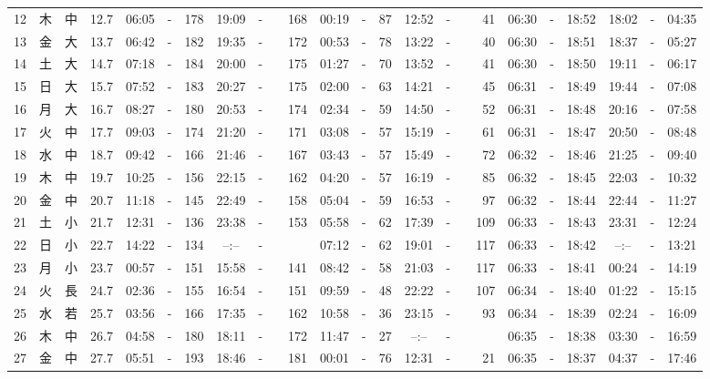 \documentclass[12pt,a4j]{jsarticle}
\begin{document}
\begin{table}[htbp]
\begin{center}
{\begin{tabular}{|rc|cr|ccrccr|ccrccr|ccc|ccc|}
12 & 木 & 中 & 12.7 &  06:05 &-& 178 &  19:09 &-& 168 &  00:19 &-&  87 &  12:52 &-&  41 & 06:30 & -& 18:52 & 18:02 & -& 04:35 \\
13 & 金 & 大 & 13.7 &  06:42 &-& 182 &  19:35 &-& 172 &  00:53 &-&  78 &  13:22 &-&  40 & 06:30 & -& 18:51 & 18:37 & -& 05:27 \\
14 & 土 & 大 & 14.7 &  07:18 &-& 184 &  20:00 &-& 175 &  01:27 &-&  70 &  13:52 &-&  41 & 06:30 & -& 18:50 & 19:11 & -& 06:17 \\
15 & 日 & 大 & 15.7 &  07:52 &-& 183 &  20:27 &-& 175 &  02:00 &-&  63 &  14:21 &-&  45 & 06:31 & -& 18:49 & 19:44 & -& 07:08 \\
16 & 月 & 大 & 16.7 &  08:27 &-& 180 &  20:53 &-& 174 &  02:34 &-&  59 &  14:50 &-&  52 & 06:31 & -& 18:48 & 20:16 & -& 07:58 \\
17 & 火 & 中 & 17.7 &  09:03 &-& 174 &  21:20 &-& 171 &  03:08 &-&  57 &  15:19 &-&  61 & 06:31 & -& 18:47 & 20:50 & -& 08:48 \\
18 & 水 & 中 & 18.7 &  09:42 &-& 166 &  21:46 &-& 167 &  03:43 &-&  57 &  15:49 &-&  72 & 06:32 & -& 18:46 & 21:25 & -& 09:40 \\
19 & 木 & 中 & 19.7 &  10:25 &-& 156 &  22:15 &-& 162 &  04:20 &-&  57 &  16:19 &-&  85 & 06:32 & -& 18:45 & 22:03 & -& 10:32 \\
20 & 金 & 中 & 20.7 &  11:18 &-& 145 &  22:49 &-& 158 &  05:04 &-&  59 &  16:53 &-&  97 & 06:32 & -& 18:44 & 22:44 & -& 11:27 \\
21 & 土 & 小 & 21.7 &  12:31 &-& 136 &  23:38 &-& 153 &  05:58 &-&  62 &  17:39 &-& 109 & 06:33 & -& 18:43 & 23:31 & -& 12:24 \\
22 & 日 & 小 & 22.7 &  14:22 &-& 134 &  --:-- &-&~~~~~ &  07:12 &-&  62 &  19:01 &-& 117 & 06:33 & -& 18:42 & --:-- & -& 13:21 \\
23 & 月 & 小 & 23.7 &  00:57 &-& 151 &  15:58 &-& 141 &  08:42 &-&  58 &  21:03 &-& 117 & 06:33 & -& 18:41 & 00:24 & -& 14:19 \\
24 & 火 & 長 & 24.7 &  02:36 &-& 155 &  16:54 &-& 151 &  09:59 &-&  48 &  22:22 &-& 107 & 06:34 & -& 18:40 & 01:22 & -& 15:15 \\
25 & 水 & 若 & 25.7 &  03:56 &-& 166 &  17:35 &-& 162 &  10:58 &-&  36 &  23:15 &-&  93 & 06:34 & -& 18:39 & 02:24 & -& 16:09 \\
26 & 木 & 中 & 26.7 &  04:58 &-& 180 &  18:11 &-& 172 &  11:47 &-&  27 &  --:-- &-&~~~~~ & 06:35 & -& 18:38 & 03:30 & -& 16:59 \\
27 & 金 & 中 & 27.7 &  05:51 &-& 193 &  18:46 &-& 181 &  00:01 &-&  76 &  12:31 &-&  21 & 06:35 & -& 18:37 & 04:37 & -& 17:46 \\

\end{tabular}}
\end{center}
\end{table}
\end{document}
